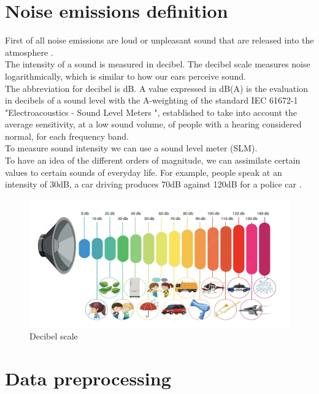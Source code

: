 \documentclass{article}
\begin{document}
{\color{red}
\section{Noise emissions definition}
\noindent First of all noise emissions are loud or unpleasant sound that are released into the atmosphere \cite{Noise_emissions_definition}. \\
The intensity of a sound is measured in decibel. The decibel scale measures noise logarithmically, which is similar to how our ears perceive sound. \\
The abbreviation for decibel is dB. A value expressed in dB(A) is the evaluation in decibels of a sound level with the A-weighting of the standard IEC 61672-1 "Electroacoustics - Sound Level Meters ", established to take into account the average sensitivity, at a low sound volume, of people with a hearing considered normal, for each frequency band.\\
To measure sound intensity we can use a sound level meter (SLM).\\
To have an idea of the different orders of magnitude, we can assimilate certain values to certain sounds of everyday life. For example, people speak at an intensity of 30dB, a car driving produces 70dB against 120dB for a police car \cite{Mesure_noise_emissions}. 

\begin{figure}[H]
    \begin{center}
        \includegraphics[width=14cm]{Decibel scale.png}
        \caption{Decibel scale}
        \label{Decibel scale}
    \end{center}
\end{figure} }

\section{Data preprocessing}
\end{document}
